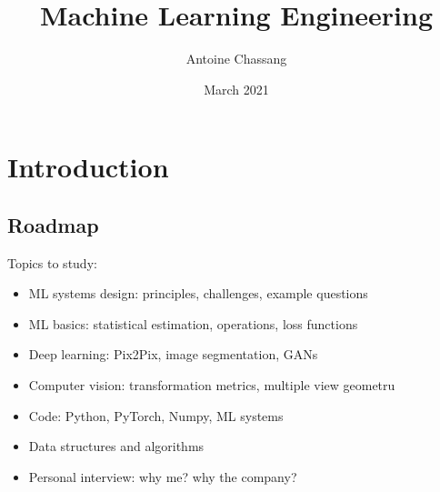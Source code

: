 \documentclass{report}
\title{Machine Learning Engineering}
\author{Antoine Chassang}
\date{March 2021}
\begin{document}
\maketitle
\tableofcontents

\chapter{Introduction}
\section{Roadmap}
Topics to study:
\begin{itemize}
    \item ML systems design: principles, challenges, example questions
    \item ML basics: statistical estimation, operations, loss functions
    \item Deep learning: Pix2Pix, image segmentation, GANs
    \item Computer vision: transformation metrics, multiple view geometru
    \item Code: Python, PyTorch, Numpy, ML systems
    \item Data structures and algorithms
    \item Personal interview: why me? why the company?
\end{itemize}








\end{document}
